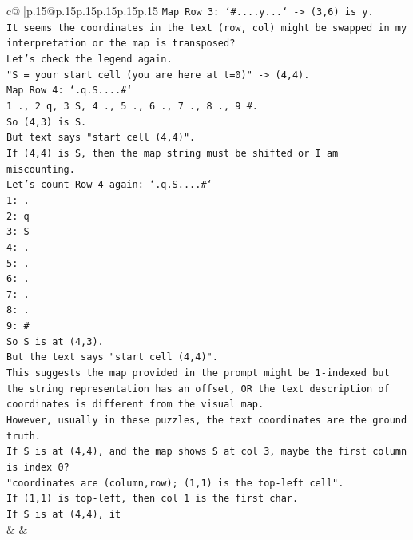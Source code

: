 \documentclass{article}
\begin{document}
{\begin{supertabular}{c@{$\;$}|p{.15\linewidth}@{}p{.15\linewidth}p{.15\linewidth}p{.15\linewidth}p{.15\linewidth}p{.15\linewidth}}
{{{\texttt{Map Row 3: `\#....y...` {-}> (3,6) is y.} \\
\texttt{It seems the coordinates in the text (row, col) might be swapped in my interpretation or the map is transposed?} \\
\texttt{Let's check the legend again.} \\
\texttt{"S = your start cell (you are here at t=0)" {-}> (4,4).} \\
\texttt{Map Row 4: `.q.S....\#`} \\
\texttt{1 ., 2 q, 3 S, 4 ., 5 ., 6 ., 7 ., 8 ., 9 \#.} \\
\texttt{So (4,3) is S.} \\
\texttt{But text says "start cell (4,4)".} \\
\texttt{If (4,4) is S, then the map string must be shifted or I am miscounting.} \\
\texttt{Let's count Row 4 again: `.q.S....\#`} \\
\texttt{1: .} \\
\texttt{2: q} \\
\texttt{3: S} \\
\texttt{4: .} \\
\texttt{5: .} \\
\texttt{6: .} \\
\texttt{7: .} \\
\texttt{8: .} \\
\texttt{9: \#} \\
\texttt{So S is at (4,3).} \\
\texttt{But the text says "start cell (4,4)".} \\
\texttt{This suggests the map provided in the prompt might be 1{-}indexed but the string representation has an offset, OR the text description of coordinates is different from the visual map.} \\
\texttt{However, usually in these puzzles, the text coordinates are the ground truth.} \\
\texttt{If S is at (4,4), and the map shows S at col 3, maybe the first column is index 0?} \\
\texttt{"coordinates are (column,row); (1,1) is the top{-}left cell".} \\
\texttt{If (1,1) is top{-}left, then col 1 is the first char.} \\
\texttt{If S is at (4,4), it} \\
            }
        }
    }
    & & \\ \\


\end{supertabular}}
\end{document}
